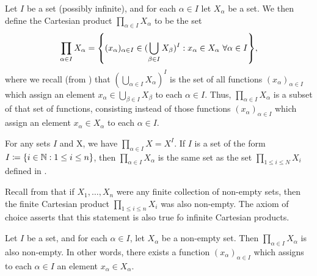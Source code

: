 \begin{defn}\label{i:8.4.1}
  Let \(I\) be a set (possibly infinite), and for each \(\alpha \in I\) let \(X_{\alpha}\) be a set.
  We then define the Cartesian product \(\prod_{\alpha \in I} X_{\alpha}\) to be the set
  \[
    \prod_{\alpha \in I} X_{\alpha} = \set{(x_{\alpha})_{\alpha \in I} \in (\bigcup_{\beta \in I} X_{\beta})^I : x_{\alpha} \in X_{\alpha} \ \forall \alpha \in I},
  \]
  where we recall (from ) that \((\bigcup_{\alpha \in I} X_{\alpha})^I\) is the set of all functions \((x_{\alpha})_{\alpha \in I}\) which assign an element \(x_{\alpha} \in \bigcup_{\beta \in I} X_{\beta}\) to each \(\alpha \in I\).
  Thus, \(\prod_{\alpha \in I} X_{\alpha}\) is a subset of that set of functions, consisting instead of those functions \((x_{\alpha})_{\alpha \in I}\) which assign an element \(x_{\alpha} \in X_{\alpha}\) to each \(\alpha \in I\).
\end{defn}

\begin{eg}\label{i:8.4.2}
  For any sets \(I\) and X, we have \(\prod_{\alpha \in I} X = X^I\).
  If \(I\) is a set of the form \(I \coloneqq \left\lbrace i \in \mathbb{N} : 1 \leq i \leq n\right\rbrace\), then \(\prod_{\alpha \in I} X_{\alpha}\) is the same set as the set \(\prod_{1 \leq i \leq N} X_i\) defined in .
\end{eg}

\begin{note}
  Recall from  that if \(X_1, \dots, X_n\) were any finite collection of non-empty sets, then the finite Cartesian product \(\prod_{1 \leq i \leq n} X_i\) was also non-empty.
  The axiom of choice asserts that this statement is also true fo infinite Cartesian products.
\end{note}

\begin{ax}[Choice]\label{i:8.1}
  Let \(I\) be a set, and for each \(\alpha \in I\), let \(X_{\alpha}\) be a non-empty set.
  Then \(\prod_{\alpha \in I} X_{\alpha}\) is also non-empty.
  In other words, there exists a function \((x_{\alpha})_{\alpha \in I}\) which assigns to each \(\alpha \in I\) an element \(x_{\alpha} \in X_{\alpha}\).
\end{ax}

